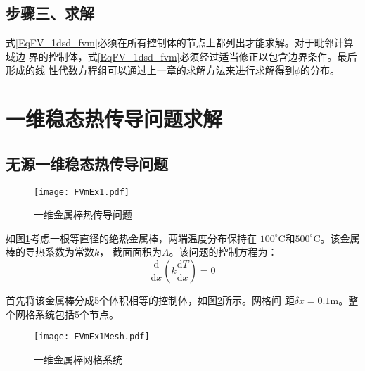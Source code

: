 \subsection{步骤三、求解}
式\eqref{EqFV_1dsd_fvm}必须在所有控制体的节点上都列出才能求解。对于毗邻计算域边
界的控制体，式\eqref{EqFV_1dsd_fvm}必须经过适当修正以包含边界条件。最后形成的线
性代数方程组可以通过上一章的求解方法来进行求解得到$\phi$的分布。

\section{一维稳态热传导问题求解}
\subsection{无源一维稳态热传导问题}
\begin{figure}[h]
  \centering
  \texttt{[image: FVmEx1.pdf]}
  \caption{一维金属棒热传导问题}
  \label{FgFV_ex1}
\end{figure}

如图\ref{FgFV_ex1}考虑一根等直径的绝热金属棒，两端温度分布保持在
$100^{\circ}\mathrm{C}$和$500^{\circ}\mathrm{C}$。该金属棒的导热系数为常数$k$，
截面面积为$A$。该问题的控制方程为：
\begin{equation}
\frac{\mathrm{d} }{\mathrm{d} x}
\left(
k\frac{\mathrm{d} T}{\mathrm{d} x}
\right)
=
0
\label{EqFV_1dsd_ex1_gov}
\end{equation}

首先将该金属棒分成5个体积相等的控制体，如图\ref{FgFV_ex1_grid}所示。网格间
距$\delta x=0.1\mathrm{m}$。整个网格系统包括5个节点。
\begin{figure}[h]
  \centering
  \texttt{[image: FVmEx1Mesh.pdf]}
  \caption{一维金属棒网格系统}
  \label{FgFV_ex1_grid}
\end{figure}

